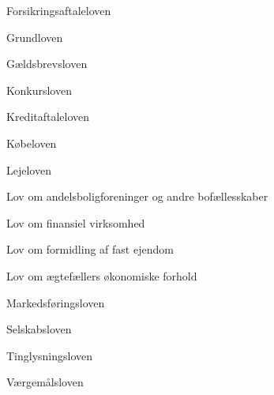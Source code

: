 \documentclass[]{book}
\begin{document}
Forsikringsaftaleloven

Grundloven

Gældsbrevsloven

Konkursloven

Kreditaftaleloven

Købeloven

Lejeloven

Lov om andelsboligforeninger og andre bofællesskaber

Lov om finansiel virksomhed

Lov om formidling af fast ejendom

Lov om ægtefællers økonomiske forhold

Markedsføringsloven

Selskabsloven

Tinglysningsloven

Værgemålsloven


\end{document}
